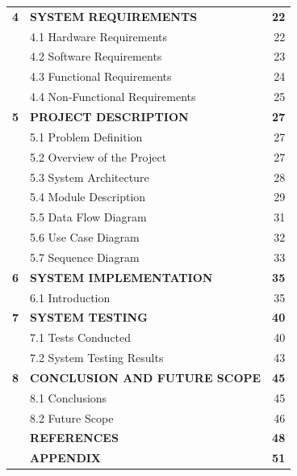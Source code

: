 \begin{tabular}{p{3.2cm} p{10.2cm} r}
\centering \textbf{4} & \textbf{SYSTEM REQUIREMENTS} & \textbf{22} \\[1mm]
& 4.1 Hardware Requirements & 22 \\[1mm]
& 4.2 Software Requirements & 23 \\[1mm]
& 4.3 Functional Requirements & 24 \\[1mm]
& 4.4 Non-Functional Requirements & 25 \\[1.5mm]

\centering \textbf{5} & \textbf{PROJECT DESCRIPTION} & \textbf{27} \\[1mm]
& 5.1 Problem Definition & 27 \\[1mm]
& 5.2 Overview of the Project & 27 \\[1mm]
& 5.3 System Architecture & 28 \\[1mm]
& 5.4 Module Description & 29 \\[1mm]
& 5.5 Data Flow Diagram & 31 \\[1mm]
& 5.6 Use Case Diagram & 32 \\[1mm]
& 5.7 Sequence Diagram & 33 \\[1.5mm]

\centering \textbf{6} & \textbf{SYSTEM IMPLEMENTATION} & \textbf{35} \\[1mm]
& 6.1 Introduction & 35 \\[1.5mm]

\centering \textbf{7} & \textbf{SYSTEM TESTING} & \textbf{40} \\[1mm]
& 7.1 Tests Conducted & 40 \\[1mm]
& 7.2 System Testing Results & 43 \\[1.5mm]

\centering \textbf{8} & \textbf{CONCLUSION AND FUTURE SCOPE} & \textbf{45} \\[1mm]
& 8.1 Conclusions & 45 \\[1mm]
& 8.2 Future Scope & 46 \\[1.5mm]

& \textbf{REFERENCES} & \textbf{48} \\[1mm]
& \textbf{APPENDIX} & \textbf{51} \\[1mm]
\hline
\end{tabular}


